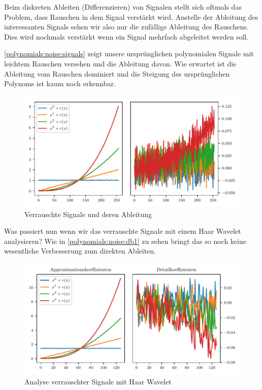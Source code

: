 \begin{refsection}
Beim diskreten Ableiten (Differenzieren) von Signalen stellt sich oftmals das
Problem, dass Rauschen in dem Signal verstärkt wird. Anstelle der Ableitung des
interessanten Signals sehen wir also nur die zufällige Ableitung des Rauschens.
Dies wird nochmals verstärkt wenn ein Signal mehrfach abgeleitet werden soll.

\autoref{polynomials:noise:signals} zeigt unsere ursprünglichen polynomialen
Signale mit leichtem Rauschen versehen und die Ableitung davon. Wie erwartet
ist die Ableitung vom Rauschen dominiert und die Steigung des ursprünglichen
Polynoms ist kaum noch erkennbar.

\begin{figure}
    \centering
    \includegraphics{papers/polynomials/images/polynomials_noise_signals.pdf}
    \caption{Verrauschte Signale und deren Ableitung\label{polynomials:noise:signals}}
\end{figure}

Was passiert nun wenn wir das verrauschte Signale mit einem Haar Wavelet
analysieren?  Wie in \autoref{polynomials:noise:db1} zu sehen bringt das so
noch keine wesentliche Verbesserung zum direkten Ableiten.

\begin{figure}
    \centering
    \includegraphics{papers/polynomials/images/polynomials_noise_db1.pdf}
    \caption{Analyse verrauschter Signale mit Haar Wavelet\label{polynomials:noise:db1}}
\end{figure}


\end{refsection}
